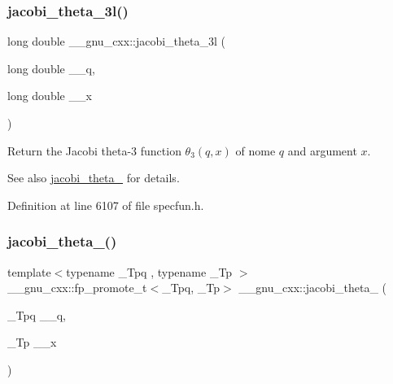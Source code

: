 \subsubsection{\texorpdfstring{jacobi\+\_\+theta\+\_\+3l()}{jacobi\_theta\_3l()}}
{\footnotesize\ttfamily long double \+\_\+\+\_\+gnu\+\_\+cxx\+::jacobi\+\_\+theta\+\_\+3l (\begin{DoxyParamCaption}\item[{long double}]{\+\_\+\+\_\+q,  }\item[{long double}]{\+\_\+\+\_\+x }\end{DoxyParamCaption})\hspace{0.3cm}{\ttfamily [inline]}}

Return the Jacobi theta-\/3 function $ \theta_3(q,x) $ of nome $ q $ and argument $ x $.

\begin{DoxySeeAlso}{See also}
\hyperlink{group__gnu__math__spec__func_gaf4eac2990db1dadba66ae688ceaa6403}{jacobi\+\_\+theta\+\_} for details. 
\end{DoxySeeAlso}


Definition at line 6107 of file specfun.\+h.

\mbox{\label{group__gnu__math__spec__func_ga676501b6284d5702a3dc61252e6c78ab}} 
\subsubsection{\texorpdfstring{jacobi\+\_\+theta\+\_()}{jacobi\_theta\_4()}}
{\footnotesize\ttfamily template$<$typename \+\_\+\+Tpq , typename \+\_\+\+Tp $>$ \\
\+\_\+\+\_\+gnu\+\_\+cxx\+::fp\+\_\+promote\+\_\+t$<$\+\_\+\+Tpq, \+\_\+\+Tp$>$ \+\_\+\+\_\+gnu\+\_\+cxx\+::jacobi\+\_\+theta\+\_ (\begin{DoxyParamCaption}\item[{\+\_\+\+Tpq}]{\+\_\+\+\_\+q,  }\item[{\+\_\+\+Tp}]{\+\_\+\+\_\+x }\end{DoxyParamCaption})\hspace{0.3cm}{\ttfamily [inline]}}

